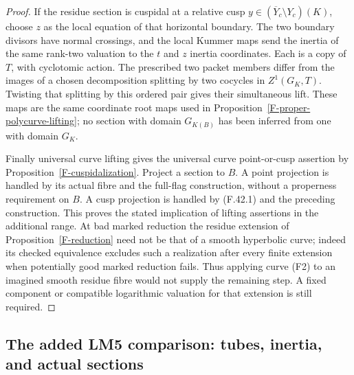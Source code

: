 \documentclass[11pt,oneside]{article}
\begin{document}
\begin{proof}
If the residue section is cuspidal at a relative cusp
$y\in(\overline Y_c\setminus Y_c)(K)$, choose $z$ as the
local equation of that horizontal boundary. The two
boundary divisors have normal crossings, and the local
Kummer maps send the inertia of the same rank-two valuation
to the $t$ and $z$ inertia coordinates. Each is a copy of
$T$, with cyclotomic action. The prescribed two packet
members differ from the images of a chosen decomposition
splitting by two cocycles in $Z^1(G_K,T)$. Twisting that
splitting by this ordered pair gives their simultaneous
lift. These maps are the same coordinate root maps used
in Proposition~\ref{F-proper-polycurve-lifting}; no section
with domain $G_{K(B)}$ has been inferred from one with
domain $G_K$.

Finally universal curve lifting gives the universal curve
point-or-cusp assertion by
Proposition~\ref{F-cuspidalization}. Project a section to
$B$. A point projection is handled by its actual fibre
and the full-flag construction, without a properness
requirement on $B$. A cusp projection is handled by
(F.42.1) and the preceding construction. This proves the
stated implication of lifting assertions in the additional
range. At bad marked reduction the residue extension of
Proposition~\ref{F-reduction} need not be that of a smooth
hyperbolic curve; indeed its checked equivalence excludes
such a realization after every finite extension when
potentially good marked reduction fails. Thus applying
curve (F2) to an imagined smooth residue fibre would not
supply the remaining step. A fixed component or compatible
logarithmic valuation for that extension is still required.
\end{proof}

\subsection{The added LM5 comparison: tubes, inertia, and actual sections}
\end{document}
